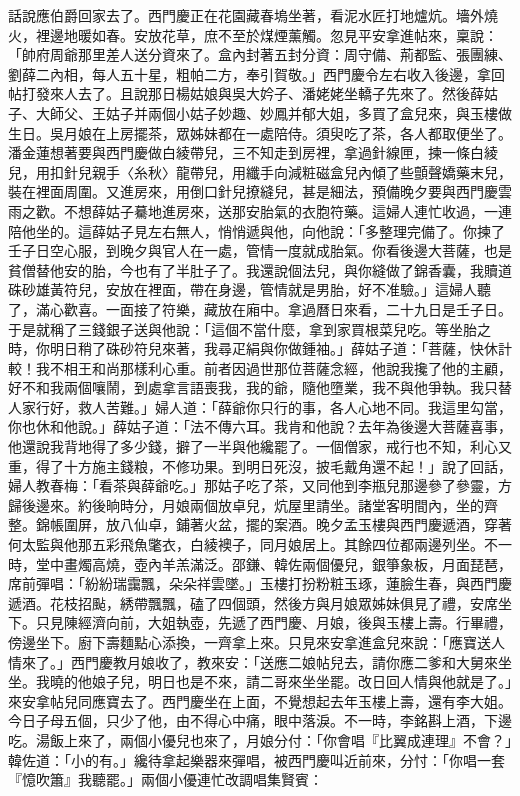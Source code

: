 \begin{showcontents}{}
話說應伯爵回家去了。西門慶正在花園藏春塢坐著，看泥水匠打地爐炕。墻外燒火，裡邊地暖如春。安放花草，庶不至於煤煙薰觸。忽見平安拿進帖來，稟說：「帥府周爺那里差人送分資來了。盒內封著五封分資：周守備、荊都監、張團練、劉薛二內相，每人五十星，粗帕二方，奉引賀敬。」西門慶令左右收入後邊，拿回帖打發來人去了。且說那日楊姑娘與吳大妗子、潘姥姥坐轎子先來了。然後薛姑子、大師父、王姑子并兩個小姑子妙趣、妙鳳并郁大姐，多買了盒兒來，與玉樓做生日。吳月娘在上房擺茶，眾姊妹都在一處陪侍。須臾吃了茶，各人都取便坐了。潘金蓮想著要與西門慶做白綾帶兒，三不知走到房裡，拿過針線匣，揀一條白綾兒，用扣針兒親手〈糸秋〉龍帶兒，用纖手向減粧磁盒兒內傾了些顫聲嬌藥末兒，裝在裡面周圍。又進房來，用倒口針兒撩縫兒，甚是細法，預備晚夕要與西門慶雲雨之歡。不想薛姑子驀地進房來，送那安胎氣的衣胞符藥。這婦人連忙收過，一連陪他坐的。這薛姑子見左右無人，悄悄遞與他，向他說：「多整理完備了。你揀了壬子日空心服，到晚夕與官人在一處，管情一度就成胎氣。你看後邊大菩薩，也是貧僧替他安的胎，今也有了半肚子了。我還說個法兒，與你縫做了錦香囊，我贖道硃砂雄黃符兒，安放在裡面，帶在身邊，管情就是男胎，好不准驗。」這婦人聽了，滿心歡喜。一面接了符樂，藏放在廂中。拿過曆日來看，二十九日是壬子日。于是就稱了三錢銀子送與他說：「這個不當什麼，拿到家買根菜兒吃。等坐胎之時，你明日稍了硃砂符兒來著，我尋疋絹與你做鍾袖。」薛姑子道：「菩薩，快休計較！我不相王和尚那樣利心重。前者因過世那位菩薩念經，他說我攙了他的主顧，好不和我兩個嚷鬧，到處拿言語喪我，我的爺，隨他墮業，我不與他爭執。我只替人家行好，救人苦難。」婦人道：「薛爺你只行的事，各人心地不同。我這里勾當，你也休和他說。」薛姑子道：「法不傳六耳。我肯和他說？去年為後邊大菩薩喜事，他還說我背地得了多少錢，擗了一半與他纔罷了。一個僧家，戒行也不知，利心又重，得了十方施主錢粮，不修功果。到明日死沒，披毛戴角還不起！」說了回話，婦人教春梅：「看茶與薛爺吃。」那姑子吃了茶，又同他到李瓶兒那邊參了參靈，方歸後邊來。約後晌時分，月娘兩個放卓兒，炕屋里請坐。諸堂客明間內，坐的齊整。錦帳圍屏，放八仙卓，鋪著火盆，擺的案酒。晚夕孟玉樓與西門慶遞酒，穿著何太監與他那五彩飛魚氅衣，白綾襖子，同月娘居上。其餘四位都兩邊列坐。不一時，堂中畫燭高燒，壺內羊羔滿泛。邵鎌、韓佐兩個優兒，銀箏象板，月面琵琶，席前彈唱：「紛紛瑞靄飄，朵朵祥雲墜。」玉樓打扮粉粧玉琢，蓮臉生春，與西門慶遞酒。花枝招颭，綉帶飄飄，磕了四個頭，然後方與月娘眾姊妹俱見了禮，安席坐下。只見陳經濟向前，大姐執壺，先遞了西門慶、月娘，後與玉樓上壽。行畢禮，傍邊坐下。廚下壽麵點心添換，一齊拿上來。只見來安拿進盒兒來說：「應寶送人情來了。」西門慶教月娘收了，教來安：「送應二娘帖兒去，請你應二爹和大舅來坐坐。我曉的他娘子兒，明日也是不來，請二哥來坐坐罷。改日回人情與他就是了。」來安拿帖兒同應寶去了。西門慶坐在上面，不覺想起去年玉樓上壽，還有李大姐。今日子母五個，只少了他，由不得心中痛，眼中落淚。不一時，李銘斟上酒，下邊吃。湯飯上來了，兩個小優兒也來了，月娘分付：「你會唱『比翼成連理』不會？」韓佐道：「小的有。」纔待拿起樂器來彈唱，被西門慶叫近前來，分忖：「你唱一套『憶吹簫』我聽罷。」兩個小優連忙改調唱集賢賓：


\end{showcontents}
